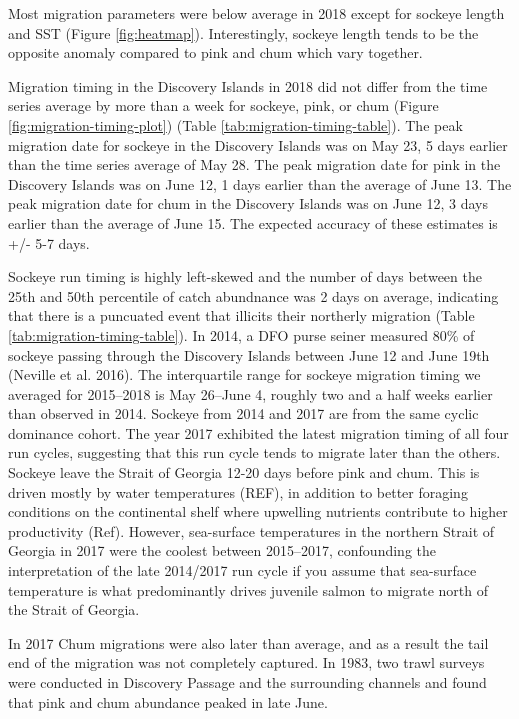 \documentclass[fleqn,10pt]{wlpeerj} %
\begin{document}
Most migration parameters were below average in 2018 except for sockeye length and SST (Figure \ref{fig:heatmap}). Interestingly, sockeye length tends to be the opposite anomaly compared to pink and chum which vary together.

Migration timing in the Discovery Islands in 2018 did not differ from the time series average by more than a week for sockeye, pink, or chum (Figure \ref{fig:migration-timing-plot}) (Table \ref{tab:migration-timing-table}). The peak migration date for sockeye in the Discovery Islands was on May 23, 5 days earlier than the time series average of May 28. The peak migration date for pink in the Discovery Islands was on June 12, 1 days earlier than the average of June 13. The peak migration date for chum in the Discovery Islands was on June 12, 3 days earlier than the average of June 15. The expected accuracy of these estimates is +/- 5-7 days.

Sockeye run timing is highly left-skewed and the number of days between the 25th and 50th percentile of catch abundnance was 2 days on average, indicating that there is a puncuated event that illicits their northerly migration (Table \ref{tab:migration-timing-table}). In 2014, a DFO purse seiner measured 80\% of sockeye passing through the Discovery Islands between June 12 and June 19th (Neville et al. 2016). The interquartile range for sockeye migration timing we averaged for 2015--2018 is May 26--June 4, roughly two and a half weeks earlier than observed in 2014. Sockeye from 2014 and 2017 are from the same cyclic dominance cohort. The year 2017 exhibited the latest migration timing of all four run cycles, suggesting that this run cycle tends to migrate later than the others. Sockeye leave the Strait of Georgia 12-20 days before pink and chum. This is driven mostly by water temperatures (REF), in addition to better foraging conditions on the continental shelf where upwelling nutrients contribute to higher productivity (Ref). However, sea-surface temperatures in the northern Strait of Georgia in 2017 were the coolest between 2015--2017, confounding the interpretation of the late 2014/2017 run cycle if you assume that sea-surface temperature is what predominantly drives juvenile salmon to migrate north of the Strait of Georgia.

In 2017 Chum migrations were also later than average, and as a result the tail end of the migration was not completely captured. In 1983, two trawl surveys were conducted in Discovery Passage and the surrounding channels and found that pink and chum abundance peaked in late June.
\end{document}

